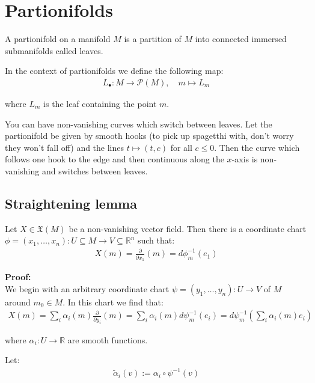 


	\section{Partionifolds}
		A partionifold on a manifold $M$ is a partition of $M$ into connected immersed submanifolds called leaves. \bigskip

		In the context of partionifolds we define the following map:
%
		\begin{align*}
			L_\bullet : M \to \mathcal{P}(M), \quad m \mapsto L_m
		\end{align*}

		where $L_m$ is the leaf containing the point $m$. \bigskip

		You can have non-vanishing curves which switch between leaves. Let the partionifold be given by smooth hooks (to pick up spagetthi with, don't worry they won't fall off) and the lines $t \mapsto (t, c)$ for all $c \leq 0$. Then the curve which follows one hook to the edge and then continuous along the $x$-axis is non-vanishing and switches between leaves. \bigskip

		\subsection{Straightening lemma}
			Let $X \in \mathfrak{X}(M)$ be a non-vanishing vector field. Then there is a coordinate chart $\phi = (x_1, \ldots, x_n) : U \subseteq M \to V \subseteq \mathbb{R}^n$ such that:
			\begin{align*}
				X(m) = \frac{\partial}{\partial x_1}(m) = d \phi_m^{-1}(e_1)
			\end{align*}

			\textbf{Proof:} \\
				We begin with an arbitrary coordinate chart $\psi = (y_1, \ldots, y_n) : U \to V$ of $M$ around $m_0 \in M$. In this chart we find that:
				\begin{align*}
					X(m) = \sum_i \alpha_i(m) \frac{\partial}{\partial y_i}(m) = \sum_i \alpha_i(m) d \psi_m^{-1}(e_i) = d \psi_m^{-1}\left(\sum_i \alpha_i(m) e_i\right)
				\end{align*}

				where $\alpha_i : U \to \mathbb{R}$ are smooth functions. \bigskip

				Let:
				\begin{align*}
					\tilde{\alpha}_i(v) := \alpha_i \circ \psi^{-1}(v)
				\end{align*}

